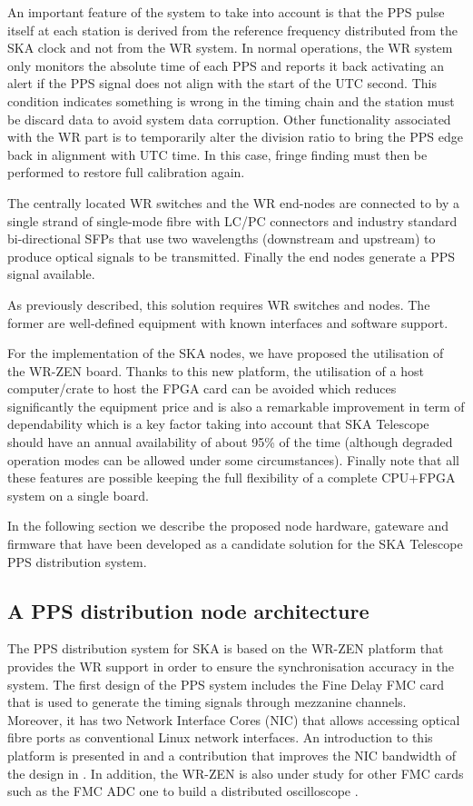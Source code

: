 An important feature of the system to take into account is that the PPS pulse
itself at each station is derived from the reference frequency distributed from
the SKA clock and not from the WR system. In normal operations, the WR system
only monitors the absolute time of each PPS and reports it back activating an
alert if the PPS signal does not align with the start of the UTC second. This
condition indicates something is wrong in the timing chain and the station must
be discard data to avoid system data corruption. Other functionality associated
with the WR part is to temporarily alter the division ratio to bring the PPS
edge back in alignment with UTC time. In this case, fringe finding must then be
performed to restore full calibration again.

The centrally located WR switches and the WR end-nodes are connected to by a
single strand of single-mode fibre with LC/PC connectors and industry standard
bi-directional SFPs that use two wavelengths (downstream and upstream) to
produce optical signals to be transmitted. Finally the end nodes generate a PPS
signal available. 

As previously described, this solution requires WR switches and nodes. The
former are well-defined equipment with known interfaces and software support. 

For the implementation of the SKA nodes, we have proposed the utilisation of
the WR-ZEN board. Thanks to this new platform, the utilisation of a host
computer/crate to host the FPGA card can be avoided which reduces significantly
the equipment price and is also a remarkable improvement in term of
dependability which is a key factor taking into account that SKA Telescope
should have an annual availability of about 95\% of the time (although degraded
operation modes can be allowed under some circumstances).  Finally note that
all these features are possible keeping the full flexibility of a complete
CPU+FPGA system on a single board. 

In the following section we describe the proposed node hardware, gateware and
firmware that have been developed as a candidate solution for the SKA Telescope
PPS distribution system. 

\subsection{A PPS distribution node architecture}
\label{subsec:ska-pps-system-arch}

The PPS distribution system for SKA is based on the WR-ZEN platform that
provides the WR support in order to ensure the synchronisation accuracy in the
system. The first design of the PPS system includes the Fine Delay FMC card
that is used to generate the timing signals through mezzanine channels.
Moreover, it has two Network Interface Cores (NIC) that allows accessing
optical fibre ports as conventional Linux network interfaces. An introduction
to this platform is presented in \cite{migueljl-paper-wr-zen-intro} and a
contribution that improves the NIC bandwidth of the design in
\cite{jorgesg-paper-wr-zen-dma}. In addition, the WR-ZEN is also under study
for other FMC cards such as the FMC ADC one to build a distributed oscilloscope
\cite{joselj-paper-wr-zen-adc}.

